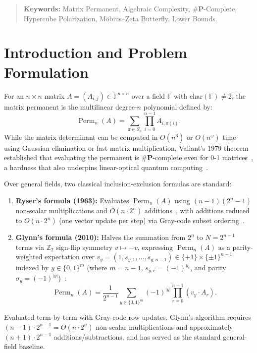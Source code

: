 \documentclass[11pt,a4paper]{article}
\newcommand{\Perm}{\operatorname{Perm}}
\newcommand{\wt}[1]{|#1|}
\begin{document}
\begin{quote}
\small\noindent\textbf{Keywords:} Matrix Permanent, Algebraic Complexity, $\#\mathbf{P}$-Complete, Hypercube Polarization, M\"obius--Zeta Butterfly, Lower Bounds.
\end{quote}

\section{Introduction and Problem Formulation}

For an $n \times n$ matrix $A = (A_{i,j}) \in \mathbb{F}^{n \times n}$ over a field $\mathbb{F}$ with $\mathrm{char}(\mathbb{F}) \neq 2$, the matrix permanent is the multilinear degree-$n$ polynomial defined by:
\begin{equation}
\label{eq:perm_def}
\Perm_n(A) = \sum_{\pi \in S_n} \prod_{i=0}^{n-1} A_{i,\pi(i)}.
\end{equation}
While the matrix determinant can be computed in $O(n^3)$ or $O(n^\omega)$ time using Gaussian elimination or fast matrix multiplication, Valiant's 1979 theorem established that evaluating the permanent is $\#\mathbf{P}$-complete even for 0-1 matrices~\cite{valiant1979}, a hardness that also underpins linear-optical quantum computing~\cite{aaronson2011}.

Over general fields, two classical inclusion-exclusion formulas are standard:
\begin{enumerate}
    \item \textbf{Ryser's formula (1963):} Evaluates $\Perm_n(A)$ using $(n-1)(2^n - 1)$ non-scalar multiplications and $O(n \cdot 2^n)$ additions~\cite{ryser1963}, with additions reduced to $O(n \cdot 2^n)$ (one vector update per step) via Gray-code subset ordering~\cite{nijenhuis1978}.
    \item \textbf{Glynn's formula (2010):} Halves the summation from $2^n$ to $N = 2^{n-1}$ terms via $\mathbb{Z}_2$ sign-flip symmetry $v \mapsto -v$, expressing $\Perm_n(A)$ as a parity-weighted expectation over $v_y = (1, s_{y,1}, \dots, s_{y,n-1}) \in \{+1\} \times \{\pm 1\}^{n-1}$ indexed by $y \in \{0,1\}^m$ (where $m = n - 1$, $s_{y,c} = (-1)^{y_c}$, and parity $\sigma_y = (-1)^{\wt{y}}$)~\cite{glynn2010}:
    \begin{equation}
    \label{eq:glynn}
    \Perm_n(A) = \frac{1}{2^{n-1}} \sum_{y \in \{0,1\}^m} (-1)^{\wt{y}} \prod_{r=0}^{n-1} (v_y \cdot A_r).
    \end{equation}
\end{enumerate}
Evaluated term-by-term with Gray-code row updates, Glynn's algorithm requires $(n-1) \cdot 2^{n-1} = \Theta(n \cdot 2^n)$ non-scalar multiplications and approximately $(n+1) \cdot 2^{n-1}$ additions/subtractions, and has served as the standard general-field baseline.
\end{document}
